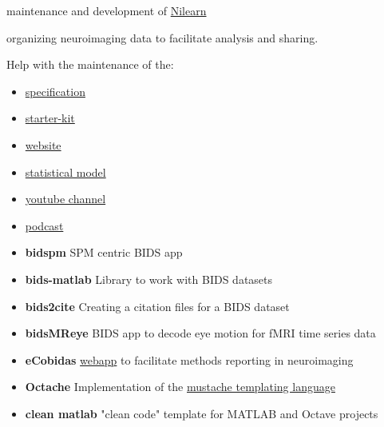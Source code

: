 
 maintenance and development of \href{https://nilearn.github.io/stable/index.html}{Nilearn}

 organizing neuroimaging data to facilitate analysis and sharing.

Help with the maintenance of the:
\begin{itemize}
    \item \href{https://bids-specification.readthedocs.io/en/latest/}{specification}
    \item \href{https://bids-standard.github.io/bids-starter-kit/}{starter-kit}
    \item \href{https://bids.neuroimaging.io/}{website}
    \item \href{https://bids-standard.github.io/stats-models/}{statistical model}
    \item \href{https://www.youtube.com/channel/UCxZUcYfd_nvIVWAbzRB1tlw}{youtube channel}
    \item \href{https://anchor.fm/bids-maintenance}{podcast}
\end{itemize}

\vspace{5mm}



\begin{itemize}
    \item \textbf{bidspm} \matlabicon \octaveicon SPM centric BIDS app
    \item \textbf{bids-matlab} \matlabicon \octaveicon Library to work with BIDS datasets
    \item \textbf{bids2cite} \pythonicon Creating a citation files for a BIDS dataset
    \item \textbf{bidsMReye} \pythonicon BIDS app to decode eye motion for fMRI time series data
    \item \textbf{eCobidas} \pythonicon \vueicon \href{https://ohbm.github.io/cobidas/}{webapp}
    to facilitate methods reporting in neuroimaging
    \item \textbf{Octache} \matlabicon \octaveicon
    Implementation of the \href{https://mustache.github.io/}{mustache templating language}
    \item \textbf{clean matlab} \matlabicon \octaveicon "clean code" template for MATLAB and Octave projects
\end{itemize}




